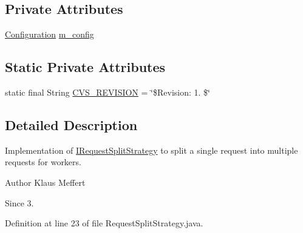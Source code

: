 \subsection*{Private Attributes}
\begin{DoxyCompactItemize}
\item 
\hyperlink{classorg_1_1jgap_1_1_configuration}{Configuration} \hyperlink{classorg_1_1jgap_1_1distr_1_1grid_1_1_request_split_strategy_a7ffc74dafef4bae5dc69e3f343ca553b}{m\-\_\-config}
\end{DoxyCompactItemize}
\subsection*{Static Private Attributes}
\begin{DoxyCompactItemize}
\item 
static final String \hyperlink{classorg_1_1jgap_1_1distr_1_1grid_1_1_request_split_strategy_a0bb126497048ce401d8b2f534ef92200}{C\-V\-S\-\_\-\-R\-E\-V\-I\-S\-I\-O\-N} = \char`\"{}\$Revision\-: 1. \$\char`\"{}
\end{DoxyCompactItemize}


\subsection{Detailed Description}
Implementation of \hyperlink{interfaceorg_1_1jgap_1_1distr_1_1grid_1_1_i_request_split_strategy}{I\-Request\-Split\-Strategy} to split a single request into multiple requests for workers.

\begin{DoxyAuthor}{Author}
Klaus Meffert 
\end{DoxyAuthor}
\begin{DoxySince}{Since}
3. 
\end{DoxySince}


Definition at line 23 of file Request\-Split\-Strategy.\-java.



